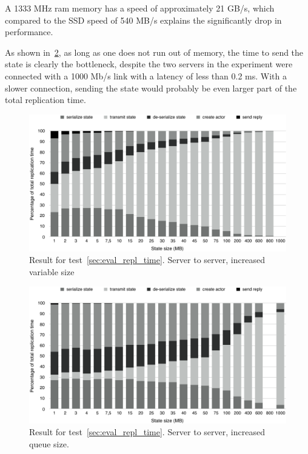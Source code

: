 \documentclass{cslthse-msc}
\begin{document}
A 1333 MHz ram memory has a speed of approximately 21 GB/s, which compared to the SSD speed of 540 MB/s explains the significantly drop in performance.

As shown in~\cref{fig:replication_time_parts_server_queue}, as long as one does not run out of memory, the time to send the state is clearly the bottleneck, despite the two servers in the experiment were connected with a 1000 Mb/s link with a latency of less than 0.2 ms. With a slower connection, sending the state would probably be even larger part of the total replication time.

\begin{figure}[hbt!]
\centering
\includegraphics[scale=0.5]{images/results/replication_time/server_parts_variable.pdf} 
\caption{Result for test~\ref{sec:eval_repl_time}. Server to server, increased variable size} \label{fig:replication_time_parts_server_variable}
\end{figure}

\begin{figure}[hbt!]
\centering
\includegraphics[scale=0.5]{images/results/replication_time/server_parts_queue.pdf} 
\caption{Result for test~\ref{sec:eval_repl_time}. Server to server, increased queue size.} \label{fig:replication_time_parts_server_queue}
\end{figure}
\end{document}
